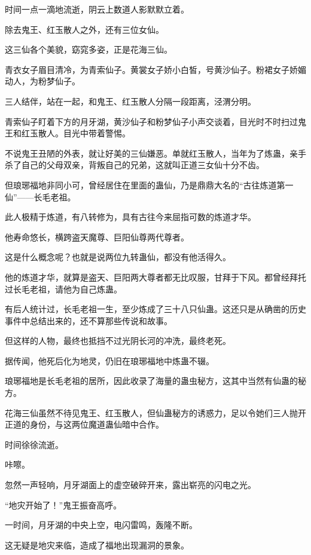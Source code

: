 
\begin{this_body}

时间一点一滴地流逝，阴云上数道人影默默立着。

除去鬼王、红玉散人之外，还有三位女仙。

这三仙各个美貌，窈窕多姿，正是花海三仙。

青衣女子眉目清冷，为青索仙子。黄裳女子娇小白皙，号黄沙仙子。粉裙女子娇媚动人，为粉梦仙子。

三人结伴，站在一起，和鬼王、红玉散人分隔一段距离，泾渭分明。

青索仙子盯着下方的月牙湖，黄沙仙子和粉梦仙子小声交谈着，目光时不时扫过鬼王和红玉散人。目光中带着警惕。

不说鬼王丑陋的外表，就让好美的三仙嫌恶。单就红玉散人，当年为了炼蛊，亲手杀了自己的父母双亲，背叛自己的兄弟，这就叫正道三女仙十分不齿。

但琅琊福地非同小可，曾经居住在里面的蛊仙，乃是鼎鼎大名的“古往炼道第一仙”——长毛老祖。

此人极精于炼道，有八转修为，具有古往今来屈指可数的炼道才华。

他寿命悠长，横跨盗天魔尊、巨阳仙尊两代尊者。

这是什么概念呢？也就是说两位九转蛊仙，都没有他活得久。

他的炼道才华，就算是盗天、巨阳两大尊者都无比叹服，甘拜于下风。都曾经拜托过长毛老祖，请他为自己炼蛊。

有后人统计过，长毛老祖一生，至少炼成了三十八只仙蛊。这还只是从确凿的历史事件中总结出来的，还不算那些传说和故事。

但这样的人物，最终也抵挡不过光阴长河的冲洗，最终老死。

据传闻，他死后化为地灵，仍旧在琅琊福地中炼蛊不辍。

琅琊福地是长毛老祖的居所，因此收录了海量的蛊虫秘方，这其中当然有仙蛊的秘方。

花海三仙虽然不待见鬼王、红玉散人，但仙蛊秘方的诱惑力，足以令她们三人抛开正道的身份，与这两位魔道蛊仙暗中合作。

时间徐徐流逝。

咔嚓。

忽然一声轻响，月牙湖面上的虚空破碎开来，露出崭亮的闪电之光。

“地灾开始了！”鬼王振奋高呼。

一时间，月牙湖的中央上空，电闪雷鸣，轰隆不断。

这无疑是地灾来临，造成了福地出现漏洞的景象。


\end{this_body}
